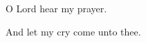 \myrule



\begin{enpars}
 \vv O Lord hear my prayer.

 \rr And let my cry come unto thee.
\end{enpars}

\myrule